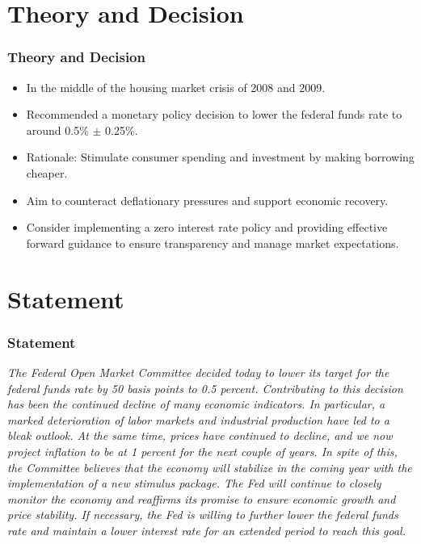 \documentclass{beamer}
\begin{document}
\section{Theory and Decision}
\begin{frame}
    \frametitle{Theory and Decision}
    \begin{itemize}
        \item In the middle of the housing market crisis of 2008 and 2009.
        \item Recommended a monetary policy decision to lower the federal funds rate to around 0.5\% \(\pm \) 0.25\%.
        \item Rationale: Stimulate consumer spending and investment by making borrowing cheaper.
        \item Aim to counteract deflationary pressures and support economic recovery.
        \item Consider implementing a zero interest rate policy and providing effective forward guidance to ensure transparency and manage market expectations.
    \end{itemize}
\end{frame}

\section{Statement}
\begin{frame}
    \frametitle{Statement}
    \textit{The Federal Open Market Committee decided today to lower its target for the federal funds rate by 50 basis points to 0.5 percent. Contributing to this decision has been the continued decline of many economic indicators. In particular, a marked deterioration of labor markets and industrial production have led to a bleak outlook. At the same time, prices have continued to decline, and we now project inflation to be at 1 percent for the next couple of years. In spite of this, the Committee believes that the economy will stabilize in the coming year with the implementation of a new stimulus package. The Fed will continue to closely monitor the economy and reaffirms its promise to ensure economic growth and price stability. If necessary, the Fed is willing to further lower the federal funds rate and maintain a lower interest rate for an extended period to reach this goal.}
\end{frame}
\end{document}
